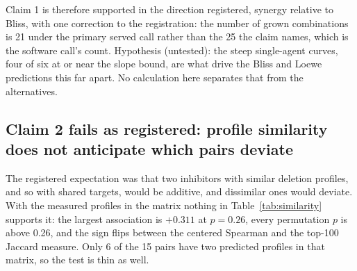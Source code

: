 \begin{table}[htbp]
\centering
\scriptsize
\caption[]{The three isobole grids, served call. Excess over Bliss is computed against the
empirical Bliss surface built from each grid's own axes, averaged over the 81 interior
cells, with a 95 percent interval from 2000 resamples of the two plate wells per cell.
The last three columns count interior cells that contradict a reference in one direction
only. ex28 is analyzed and flagged, not trusted.}
\label{tab:isoboles}

\end{table}


Claim 1 is therefore supported in the direction registered, synergy relative to Bliss,
with one correction to the registration: the number of grown combinations is 21 under the
primary served call rather than the 25 the claim names, which is the software call's
count. Hypothesis (untested): the steep single-agent curves, four of six at or near the
slope bound, are what drive the Bliss and Loewe predictions this far apart. No
calculation here separates that from the alternatives.

\subsection{Claim 2 fails as registered: profile similarity does not anticipate which
pairs deviate}
\label{sec:claim2}

The registered expectation was that two inhibitors with similar deletion profiles, and so
with shared targets, would be additive, and dissimilar ones would deviate. With the
measured profiles in the matrix nothing in Table~\ref{tab:similarity} supports it: the
largest association is $+0.311$ at $p = 0.26$, every permutation $p$ is above 0.26, and
the sign flips between the centered Spearman and the top-100 Jaccard measure. Only 6 of
the 15 pairs have two predicted profiles in that matrix, so the test is thin as well.

